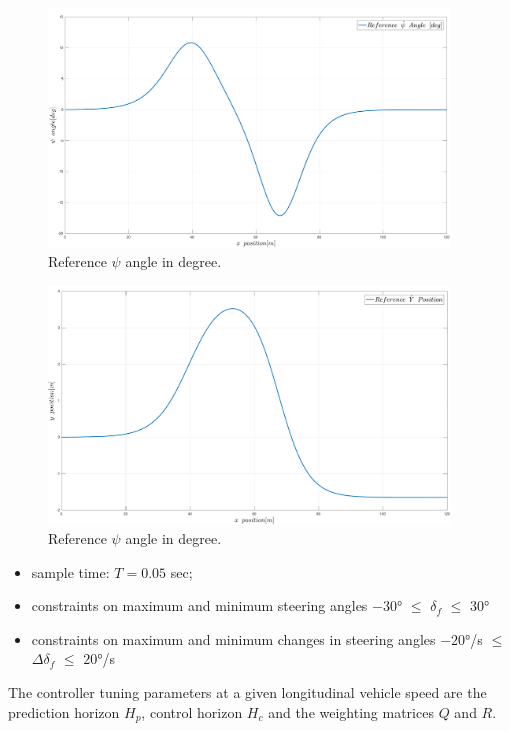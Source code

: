 \documentclass[12pt]{article}
\begin{document}
\begin{figure}[h]
	\centering
	\includegraphics[width=0.95\textwidth,keepaspectratio]{images/Reference-Yaw-Angle.pdf}
	\caption{Reference $\psi$ angle in degree.}
	\label{fig_04:reference_yaw_angle}
\end{figure}

\begin{figure}[t]
	\centering
	\includegraphics[width=0.95\textwidth,keepaspectratio]{images/Reference-Y-Position.pdf}
	\caption{Reference $\psi$ angle in degree.}
	\label{fig_05:reference_Y_position}
\end{figure}



\begin{itemize}
	\item sample time: $T = 0.05$ sec;
	\item constraints on maximum and minimum steering angles $\ang{-30}$ $\leq$ $\delta_{f}$ $\leq$
$\ang{30}$
	\item constraints on maximum and minimum changes in steering angles $\ang{-20}$/s $\leq$ $\Delta\delta_{f}$ $\leq$ $\ang{20}$/s
\end{itemize}
The controller tuning parameters at a given longitudinal vehicle speed are the prediction horizon $H_p$, control horizon $H_c$ and the weighting matrices $Q$ and $R$.
\end{document}
